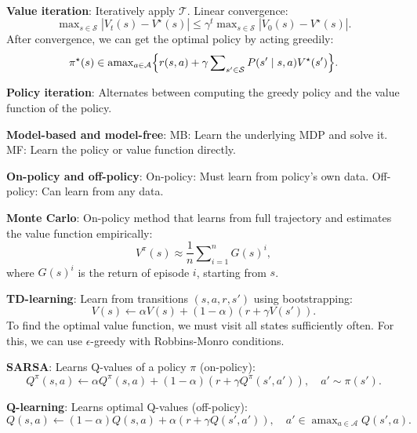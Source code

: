 \documentclass{article}
\DeclareMathOperator*{\argmax}{amax}
\newcommand{\lft}{\mathopen{}\mathclose\bgroup\left}
\newcommand{\rgt}{\aftergroup\egroup\right}
\newenvironment{topic}[1]
{\textbf{\sffamily \colorbox{black}{\rlap{\textbf{\textcolor{white}{#1}}}\hspace{\linewidth}\hspace{-2\fboxsep}}} \\ \vspace{0.2cm}}
{}
\begin{document}
\begin{multicols*}{2}
\begin{topic}{Reinforcement learning}
        \textbf{Value iteration}: Iteratively apply $\mathcal{T}$. Linear convergence: \[
            \max\nolimits_{s \in \mathcal{S}} |V_t(s) - V^\star(s)| \leq \gamma^t \max\nolimits_{s \in \mathcal{S}} |V_0(s) - V^\star(s)|.
        \]
        After convergence, we can get the optimal policy by acting greedily: \[
            \pi^\star(s) \in \argmax\nolimits_{a \in \mathcal{A}} \lft\{ r(s,a) + \gamma \sum\nolimits_{s' \in \mathcal{S}} P(s' \mid s, a) V^\star(s') \rgt\}.
        \]

        \textbf{Policy iteration}: Alternates between computing the greedy policy and the value
        function of the policy.

        \textbf{Model-based and model-free}: MB: Learn the underlying MDP and solve it.
        MF: Learn the policy or value function directly.

        \textbf{On-policy and off-policy}: On-policy: Must learn from policy's own data. Off-policy:
        Can learn from any data.

        \textbf{Monte Carlo}: On-policy method that learns from full trajectory and estimates the value function empirically: \[
            V^\pi(s) \approx \frac{1}{n} \sum\nolimits_{i=1}^{n} G(s)^i,
        \]
        where $G(s)^i$ is the return of episode $i$, starting from $s$.

        \textbf{TD-learning}: Learn from transitions $(s, a, r, s')$ using bootstrapping: \[
            V(s) \gets \alpha V(s) + (1- \alpha) (r + \gamma V(s')).
        \]
        To find the optimal value function, we must visit all states sufficiently often. For this, we can
        use $\epsilon$-greedy with Robbins-Monro conditions.

        \textbf{SARSA}: Learns Q-values of a policy $\pi$ (on-policy): \[
            Q^\pi(s,a) \gets \alpha Q^\pi(s,a) + (1-\alpha) (r + \gamma Q^\pi(s', a')), \quad a' \sim \pi(s').
        \]

        \textbf{Q-learning}: Learns optimal Q-values (off-policy): \[
            Q(s,a) \gets (1-\alpha) Q(s,a) + \alpha (r + \gamma Q(s',a')), \quad a' \in \argmax\nolimits_{a \in \mathcal{A}} Q(s', a).
        \]


\end{topic}
\end{multicols*}
\end{document}
